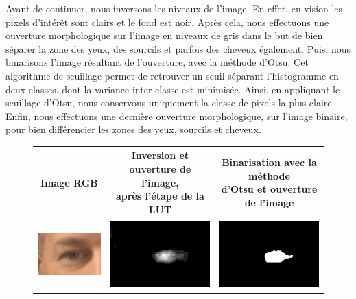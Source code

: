 Avant de continuer, nous inversons les niveaux de l'image. En effet, en vision les pixels d'intérêt sont clairs et le fond est noir.
Après cela, nous effectuons une ouverture morphologique sur l'image en niveaux de gris dans le but de 
bien séparer la zone des yeux, des sourcils et parfois des cheveux également. Puis, nous binarisons
l'image résultant de l'ouverture, avec la méthode d'Otsu\cite{OTSU_paper}. Cet algorithme de seuillage 
permet de retrouver un seuil séparant l'histogramme en deux classes, dont la variance inter-classe est 
minimisée. Ainsi, en appliquant le seuillage d'Otsu, nous conservons uniquement la classe de pixels la plus 
claire. Enfin, nous effectuons une dernière ouverture morphologique, sur l'image binaire, pour bien 
différencier les zones des yeux, sourcils et cheveux.

\begin{figure}[H]
  \centering
  \begin{tabular}{|c|c|c|}
    \hline
     Image RGB & \shortstack{Inversion et ouverture de l'image, \\ après l'étape de la LUT}  & \shortstack{Binarisation avec la méthode \\ d'Otsu et ouverture de l'image} \\
    \hline
    \includegraphics[width=4cm]{image/008/rgb_source.png} & \includegraphics[width=4cm]{image/008/ycbcr_inv_open.png} & \includegraphics[width=4cm]{image/008/ycbcr_bin_open.png} \\
    \hline

\end{tabular}
\end{figure}
